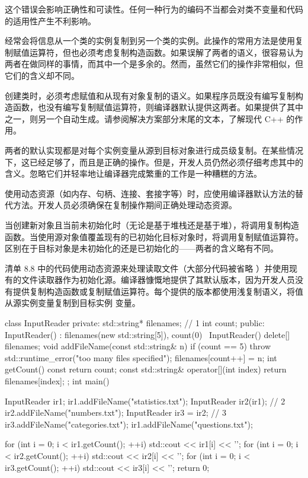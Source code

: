 这个错误会影响正确性和可读性。任何一种行为的编码不当都会对类不变量和代码的适用性产生不利影响。

经常会将信息从一个类的实例复制到另一个类的实例。此操作的常用方法是使用复制赋值运算符，但也必须考虑复制构造函数。如果误解了两者的语义，很容易认为两者在做同样的事情，而其中一个是多余的。然而，虽然它们的操作非常相似，但它们的含义却不同。


创建类时，必须考虑赋值和从现有对象复制的语义。如果程序员既没有编写复制构造函数，也没有编写复制赋值运算符，则编译器默认提供这两者。如果提供了其中之一，则另一个自动生成。请参阅解决方案部分末尾的文本，了解现代 C++ 的作用。

两者的默认实现都是对每个实例变量从源到目标对象进行成员级复制。在某些情况下，这已经足够了，而且是正确的操作。但是，开发人员仍然必须仔细考虑其中的含义。忽略它们并轻率地让编译器完成繁重的工作是一种糟糕的方法。

使用动态资源（如内存、句柄、连接、套接字等）时，应使用编译器默认方法的替代方法。开发人员必须确保在复制操作期间正确处理动态资源。

当创建新对象且当前未初始化时（无论是基于堆栈还是基于堆），将调用复制构造函数。当使用源对象值覆盖现有的已初始化目标对象时，将调用复制赋值运算符。区别在于目标对象是未初始化的还是已初始化的——两者的含义略有不同。

清单 8.8 中的代码使用动态资源来处理读取文件（大部分代码被省略 ）并使用现有的文件读取器作为初始化源。编译器慷慨地提供了其默认版本，因为开发人员没有提供复制构造函数或复制赋值运算符。每个提供的版本都使用浅复制语义，将值从源实例变量复制到目标实例 变量。


\begin{cpp}
class InputReader {
private:
  std::string* filenames; // 1
  int count;
public:
  InputReader() : filenames(new std::string[5]), count(0) {}
  ~InputReader() { delete[] filenames; }
  void addFileName(const std::string& n) {
    if (count == 5)
      throw std::runtime_error("too many files specified");
    filenames[count++] = n;
  }
  int getCount() const { return count; }
  const std::string& operator[](int index) {
    return filenames[index];
  }
};
int main() {
  InputReader ir1;
  ir1.addFileName("statistics.txt");
  InputReader ir2(ir1); // 2
  ir2.addFileName("numbers.txt");
  InputReader ir3 = ir2; // 3
  ir3.addFileName("categories.txt");
  ir1.addFileName("questions.txt");

  for (int i = 0; i < ir1.getCount(); ++i)
    std::cout << ir1[i] << '\n';
  for (int i = 0; i < ir2.getCount(); ++i)
    std::cout << ir2[i] << '\n';
  for (int i = 0; i < ir3.getCount(); ++i)
    std::cout << ir3[i] << '\n';
  return 0;
}
\end{cpp}

